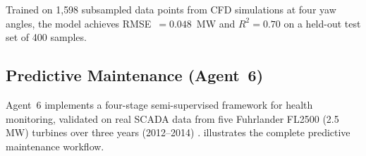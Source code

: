 \documentclass[12pt]{article}
\begin{document}
Trained on 1{,}598 subsampled data points from CFD simulations at four yaw angles, the model achieves RMSE~$= 0.048$~MW and $R^2 = 0.70$ on a held-out test set of 400 samples.


\subsection{Predictive Maintenance (Agent~6)}
\label{sec:pdm}

Agent~6 implements a four-stage semi-supervised framework for health monitoring, validated on real SCADA data from five Fuhrlander FL2500 (2.5\,MW) turbines over three years (2012--2014) \citep{blanco2020}.
 illustrates the complete predictive maintenance workflow.

\end{document}
